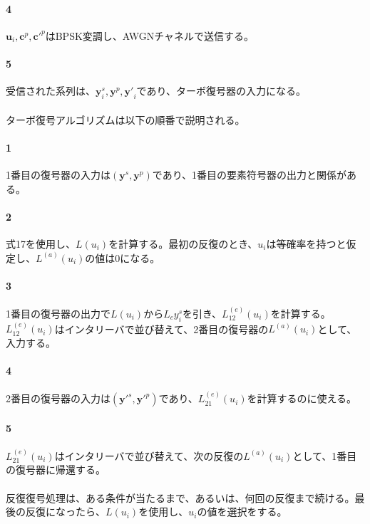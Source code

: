 \documentclass[20 pts]{article}
\begin{document}
\paragraph{4} $\boldsymbol{u}_i,\boldsymbol{c}^p,{\boldsymbol{c}'}^p$はBPSK変調し、AWGNチャネルで送信する。\\

\paragraph{5} 受信された系列は、$\boldsymbol{y}_i^s,\boldsymbol{y}^p,{\boldsymbol{y}'}_i$であり、ターボ復号器の入力になる。\paragraph{}

ターボ復号アルゴリズムは以下の順番で説明される。
\paragraph{1}
1番目の復号器の入力は$(\boldsymbol{y}^s,\boldsymbol{y}^p)$であり、1番目の要素符号器の出力と関係がある。
\paragraph{2}
式17を使用し、$L(u_i)$を計算する。最初の反復のとき、$u_i$は等確率を持つと仮定し、$L^{(a)}(u_i)$の値は0になる。
\paragraph{3}
1番目の復号器の出力で$L(u_i)$から$L_cy_i^s$を引き、$L_{12}^{(e)}(u_i)$を計算する。$L_{12}^{(e)}(u_i)$はインタリーバで並び替えて、2番目の復号器の$L^{(a)}(u_i)$として、入力する。
\paragraph{4}
2番目の復号器の入力は$({\boldsymbol{y}'}^s,{\boldsymbol{y}'}^p)$であり、$L_{21}^{(e)}(u_i)$を計算するのに使える。
\paragraph{5}
$L_{21}^{(e)}(u_i)$はインタリーバで並び替えて、次の反復の$L^{(a)}(u_i)$として、1番目の復号器に帰還する。
\paragraph{}
反復復号処理は、ある条件が当たるまで、あるいは、何回の反復まで続ける。最後の反復になったら、$L(u_i)$を使用し、$u_i$の値を選択をする。
\end{document}
